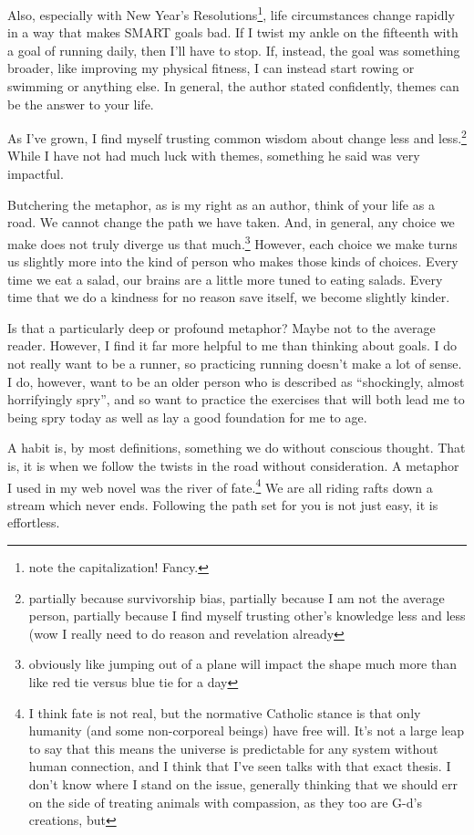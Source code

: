 \documentclass[12pt]{article}
\newcommand{\say}[1]{``#1''}
\renewcommand{\,}{\textsuperscript{,}}
\begin{document}
Also, especially with New Year's Resolutions\footnote{note the capitalization! Fancy.}, life circumstances change rapidly in a way that makes SMART goals bad.  
If I twist my ankle on the fifteenth with a goal of running daily, then I'll have to stop.  
If, instead, the goal was something broader, like improving my physical fitness, I can instead start rowing or swimming or anything else.  
In general, the author stated confidently, themes can be the answer to your life.

As I've grown, I find myself trusting common wisdom about change less and less.\footnote{partially because survivorship bias, partially because I am not the average person, partially because I find myself trusting other's knowledge less and less (wow I really need to do reason and revelation already}  
While I have not had much luck with themes, something he said was very impactful.

Butchering the metaphor, as is my right as an author, think of your life as a road.  
We cannot change the path we have taken.  
And, in general, any choice we make does not truly diverge us that much.\footnote{obviously like jumping out of a plane will impact the shape much more than like red tie versus blue tie for a day}  
However, each choice we make turns us slightly more into the kind of person who makes those kinds of choices.  
Every time we eat a salad, our brains are a little more tuned to eating salads.  
Every time that we do a kindness for no reason save itself, we become slightly kinder.

Is that a particularly deep or profound metaphor? Maybe not to the average reader.  
However, I find it far more helpful to me than thinking about goals.  
I do not really want to be a runner, so practicing running doesn't make a lot of sense.  
I do, however, want to be an older person who is described as \say{shockingly, almost horrifyingly spry}, and so want to practice the exercises that will both lead me to being spry today as well as lay a good foundation for me to age.

A habit is, by most definitions, something we do without conscious thought.  
That is, it is when we follow the twists in the road without consideration.  
A metaphor I used in my web novel was the river of fate.\footnote{I think fate is not real, but the normative Catholic stance is that only humanity (and some non-corporeal beings) have free will. It's not a large leap to say that this means the universe is predictable for any system without human connection, and I think that I've seen talks with that exact thesis. I don't know where I stand on the issue, generally thinking that we should err on the side of treating animals with compassion, as they too are G-d's creations, but}  
We are all riding rafts down a stream which never ends.  
Following the path set for you is not just easy, it is effortless.
\end{document}
